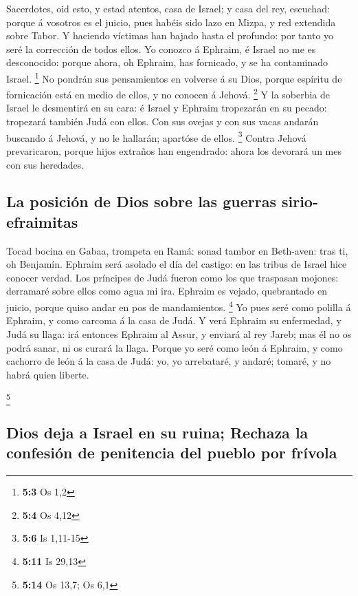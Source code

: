  Sacerdotes, oid esto, y estad atentos, casa de Israel; y
casa del rey, escuchad: porque á vosotros es el juicio, pues habéis sido
lazo en Mizpa, y red extendida sobre Tabor.  Y haciendo
víctimas han bajado hasta el profundo: por tanto yo seré la corrección
de todos ellos.  Yo conozco á Ephraim, é Israel no me es
desconocido: porque ahora, oh Ephraim, has fornicado, y se ha
contaminado Israel. \footnote{\textbf{5:3} Os 1,2}  No
pondrán sus pensamientos en volverse á su Dios, porque espíritu de
fornicación está en medio de ellos, y no conocen á Jehová. \footnote{\textbf{5:4}
  Os 4,12}  Y la soberbia de Israel le desmentirá en su
cara: é Israel y Ephraim tropezarán en su pecado: tropezará también Judá
con ellos.  Con sus ovejas y con sus vacas andarán buscando
á Jehová, y no le hallarán; apartóse de ellos. \footnote{\textbf{5:6} Is
  1,11-15}  Contra Jehová prevaricaron, porque hijos
extraños han engendrado: ahora los devorará un mes con sus heredades.

\hypertarget{la-posiciuxf3n-de-dios-sobre-las-guerras-sirio-efraimitas}{%
\subsection{La posición de Dios sobre las guerras
sirio-efraimitas}\label{la-posiciuxf3n-de-dios-sobre-las-guerras-sirio-efraimitas}}

 Tocad bocina en Gabaa, trompeta en Ramá: sonad tambor en
Beth-aven: tras ti, oh Benjamín.  Ephraim será asolado el
día del castigo: en las tribus de Israel hice conocer verdad.
 Los príncipes de Judá fueron como los que traspasan
mojones: derramaré sobre ellos como agua mi ira.  Ephraim
es vejado, quebrantado en juicio, porque quiso andar en pos de
mandamientos. \footnote{\textbf{5:11} Is 29,13}  Yo pues
seré como polilla á Ephraim, y como carcoma á la casa de Judá.
 Y verá Ephraim su enfermedad, y Judá su llaga: irá
entonces Ephraim al Assur, y enviará al rey Jareb; mas él no os podrá
sanar, ni os curará la llaga.  Porque yo seré como león á
Ephraim, y como cachorro de león á la casa de Judá: yo, yo arrebataré, y
andaré; tomaré, y no habrá quien liberte.

\footnote{\textbf{5:14} Os 13,7; Os 6,1}

\hypertarget{dios-deja-a-israel-en-su-ruina-rechaza-la-confesiuxf3n-de-penitencia-del-pueblo-por-fruxedvola}{%
\subsection{Dios deja a Israel en su ruina; Rechaza la confesión de
penitencia del pueblo por
frívola}\label{dios-deja-a-israel-en-su-ruina-rechaza-la-confesiuxf3n-de-penitencia-del-pueblo-por-fruxedvola}}


